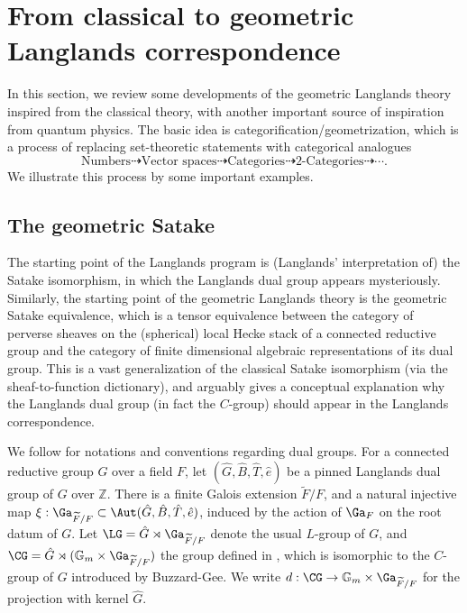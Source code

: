 \documentclass[11pt]{amsart}
\theoremstyle{definition}
\theoremstyle{definition}
\theoremstyle{definition}
\numberwithin{equation}{section}
\newcommand{\bG}{{\mathbb G}}
\newcommand{\bZ}{{\mathbb Z}}
\begin{document}
\section{From classical to geometric Langlands correspondence}
In this section, we review some developments of the geometric Langlands theory inspired from the classical theory, with another important source of inspiration from quantum physics. The basic idea is categorification/geometrization, which is a process of replacing set-theoretic statements with categorical analogues
\begin{equation}\label{categorification}
\text{Numbers}\dashrightarrow \text{Vector spaces} \dashrightarrow \text{Categories} \dashrightarrow \text{2-Categories} \dashrightarrow \cdots. 
\end{equation}
We illustrate this process by some important examples.

\subsection{The geometric Satake}\label{S: geometric Satake}
The starting point of the Langlands program is  (Langlands' interpretation of) the Satake isomorphism, in which the Langlands dual group appears mysteriously.
Similarly, the starting point of the geometric Langlands theory is the geometric Satake equivalence, which is a tensor equivalence between the category of perverse sheaves on the (spherical) local Hecke stack of a connected reductive group and the category of finite dimensional algebraic representations of its dual group. This is a vast generalization of the classical Satake isomorphism (via the sheaf-to-function dictionary), and arguably gives a conceptual explanation why the Langlands dual group (in fact the $C$-group) should appear in the Langlands correspondence. 


We follow \cite[Sect. 1.1]{Zhu-Integral-Satake} for notations and conventions regarding dual groups. For a connected reductive group $G$ over a field $F$, let $(\hat G, \hat B, \hat T ,\hat{e})$ be a pinned Langlands dual group of $G$ over $\bZ$. There is a finite Galois extension $\widetilde F/F$, and a natural injective map $\xi:\Ga_{\widetilde F/F}\subset  \Aut(\hat G, \hat B, \hat T, \hat e)$,  induced by the action of $\Ga_F$ on the root datum of $G$. Let $\LG=\hat{G}\rtimes\Ga_{\widetilde F/F}$ denote the usual $L$-group of $G$, and $\CG=\hat{G}\rtimes (\bG_m\times\Ga_{\widetilde F/F})$ the group defined in \cite{Zhu-Integral-Satake}, which is isomorphic to the $C$-group of $G$ introduced by Buzzard-Gee. We write $d: \CG\to \bG_m\times\Ga_{\widetilde F/F}$ for the projection with kernel $\hat{G}$.
\end{document}
